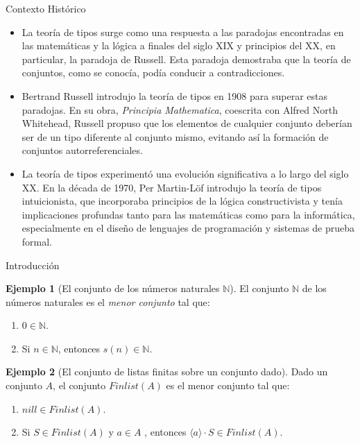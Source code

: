 \documentclass[dvipsnames, 8pt]{beamer} %
\theoremstyle{plain}
\newcommand{\N}{\mathbb{N}}
\theoremstyle{definition}
\newtheorem{ejemplo}{Ejemplo}
\begin{document}
\begin{frame}{Contexto Histórico}
    \begin{itemize}
        \item La teoría de tipos surge como una respuesta a las paradojas encontradas en las matemáticas y la lógica a finales del siglo XIX y principios del XX, en particular, la paradoja de Russell. Esta paradoja demostraba que la teoría de conjuntos, como se conocía, podía conducir a contradicciones.\pause
        \item Bertrand Russell introdujo la teoría de tipos en 1908 para superar estas paradojas. En su obra, \emph{Principia Mathematica}, coescrita con Alfred North Whitehead, Russell propuso que los elementos de cualquier conjunto deberían ser de un tipo diferente al conjunto mismo, evitando así la formación de conjuntos autorreferenciales.\pause
        \item La teoría de tipos experimentó una evolución significativa a lo largo del siglo XX. En la década de 1970, Per Martin-Löf introdujo la teoría de tipos intuicionista, que incorporaba principios de la lógica constructivista y tenía implicaciones profundas tanto para las matemáticas como para la informática, especialmente en el diseño de lenguajes de programación y sistemas de prueba formal.
    \end{itemize}
\end{frame}

\begin{frame}{Introducción}
    \begin{ejemplo} [El conjunto de los números naturales $\N$]
        El conjunto $\N$ de los números naturales es el \emph{menor conjunto} tal que:\pause
        \begin{enumerate}
            \item $0 \in \N$.
            \item Si $n \in \N$, entonces $s(n )\in \N$.
        \end{enumerate}
    \end{ejemplo}\pause
    \begin{ejemplo}[El conjunto de listas finitas sobre un conjunto dado]
        Dado un conjunto $A$, el conjunto $Finlist(A)$ es el menor conjunto tal que:\pause
        \begin{enumerate}
            \item $nill \in Finlist(A)$.\pause
            \item Si $S \in Finlist(A)$ y $a \in A$ , entonces $\langle a \rangle\cdot S\in Finlist(A)$.
        \end{enumerate}
    \end{ejemplo}
\end{frame}
\end{document}
